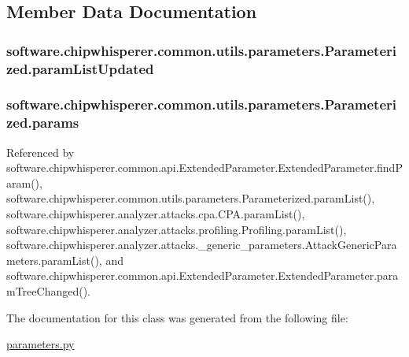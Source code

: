 \subsection{Member Data Documentation}
\hypertarget{classsoftware_1_1chipwhisperer_1_1common_1_1utils_1_1parameters_1_1Parameterized_acf38aa3f6634073f4162fba0abf0501c}{}
\subsubsection[{param\+List\+Updated}]{\setlength{\rightskip}{0pt plus 5cm}software.\+chipwhisperer.\+common.\+utils.\+parameters.\+Parameterized.\+param\+List\+Updated}\label{classsoftware_1_1chipwhisperer_1_1common_1_1utils_1_1parameters_1_1Parameterized_acf38aa3f6634073f4162fba0abf0501c}
\hypertarget{classsoftware_1_1chipwhisperer_1_1common_1_1utils_1_1parameters_1_1Parameterized_a4e79c2f229cc9b366e4d4aa2f584c990}{}
\subsubsection[{params}]{\setlength{\rightskip}{0pt plus 5cm}software.\+chipwhisperer.\+common.\+utils.\+parameters.\+Parameterized.\+params}\label{classsoftware_1_1chipwhisperer_1_1common_1_1utils_1_1parameters_1_1Parameterized_a4e79c2f229cc9b366e4d4aa2f584c990}


Referenced by software.\+chipwhisperer.\+common.\+api.\+Extended\+Parameter.\+Extended\+Parameter.\+find\+Param(), software.\+chipwhisperer.\+common.\+utils.\+parameters.\+Parameterized.\+param\+List(), software.\+chipwhisperer.\+analyzer.\+attacks.\+cpa.\+C\+P\+A.\+param\+List(), software.\+chipwhisperer.\+analyzer.\+attacks.\+profiling.\+Profiling.\+param\+List(), software.\+chipwhisperer.\+analyzer.\+attacks.\+\_\+generic\+\_\+parameters.\+Attack\+Generic\+Parameters.\+param\+List(), and software.\+chipwhisperer.\+common.\+api.\+Extended\+Parameter.\+Extended\+Parameter.\+param\+Tree\+Changed().



The documentation for this class was generated from the following file\+:\begin{DoxyCompactItemize}
\item 
\hyperlink{parameters_8py}{parameters.\+py}\end{DoxyCompactItemize}
